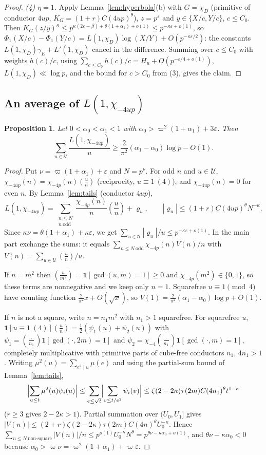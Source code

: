 \documentclass[11pt,reqno]{amsart}
\newtheorem{proposition}[theorem]{Proposition}
\theoremstyle{definition}
\newcommand{\eps}{\varepsilon}
\newcommand{\leg}[2]{\left(\frac{#1}{#2}\right)}
\newcommand{\cU}{\mathcal U}
\begin{document}
\begin{proof}
\emph{(4) $\eta=1$.}  Apply Lemma~\ref{lem:hyperbola}(b) with $G=\chi_D$
(primitive of conductor $4up$, $K_G=(1+r)C(4up)^\theta$), $z=p^\eps$ and
$y\in\{X/c,Y/c\}$, $c\le C_0$.  Then
$K_G(z/y)^\kappa\le p^{\kappa(2\eps-\beta)+\theta(1+\alpha_1)+o(1)}\le
p^{-\kappa\eps+o(1)}$, so
$\Phi_1(X/c)-\Phi_1(Y/c)=L(1,\chi_D)\log(X/Y)+O(p^{-\kappa\eps/2})$: the
constants $L(1,\chi_D)\gamma_E+L'(1,\chi_D)$ cancel in the difference.
Summing over $c\le C_0$ with weights $h(c)/c$, using
$\sum_{c\le C_0}h(c)/c=H_u+O(p^{-\eps/4+o(1)})$, $L(1,\chi_D)\ll\log p$, and
the bound for $c>C_0$ from (3), gives the claim.
\end{proof}

\subsection{An average of $L(1,\chi_{-4up})$}
\begin{proposition}\label{prop:Lavg}
Let $0<\alpha_0<\alpha_1<1$ with $\alpha_0>\varpi^2(1+\alpha_1)+3\eps$.  Then
\[
 \sum_{u\in\cU}\frac{L(1,\chi_{-4up})}{u}\ge\frac2{\pi^2}(\alpha_1-\alpha_0)\log p-O(1).
\]
\end{proposition}
\begin{proof}
Put $\nu=\varpi(1+\alpha_1)+\eps$ and $N=p^\nu$.  For odd $n$ and
$u\in\cU$, $\chi_{-4up}(n)=\chi_{-4p}(n)\leg un$ (reciprocity, $u\equiv1\
(4)$), and $\chi_{-4up}(n)=0$ for even $n$.  By Lemma~\ref{lem:tails}
(conductor $4up$),
\[
 L(1,\chi_{-4up})=\sum_{\substack{n\le N\\ n\ \mathrm{odd}}}\frac{\chi_{-4p}(n)}n\leg un+\varrho_u,
 \qquad|\varrho_u|\le(1+r)C(4up)^\theta N^{-\kappa}.
\]
Since $\kappa\nu=\theta(1+\alpha_1)+\kappa\eps$, we get
$\sum_{u\in\cU}|\varrho_u|/u\le p^{-\kappa\eps+o(1)}$.  In the main part
exchange the sums: it equals $\sum_{n\le N\ \mathrm{odd}}\chi_{-4p}(n)
V(n)/n$ with $V(n)=\sum_{u\in\cU}\leg un/u$.

If $n=m^2$ then $\leg u{m^2}=\mathbf 1[\gcd(u,m)=1]\ge0$ and
$\chi_{-4p}(m^2)\in\{0,1\}$, so these terms are nonnegative and we keep only
$n=1$.  Squarefree $u\equiv1\pmod4$ have counting function
$\frac2{\pi^2}x+O(\sqrt x)$, so
$V(1)=\frac2{\pi^2}(\alpha_1-\alpha_0)\log p+O(1)$.

If $n$ is not a square, write $n=n_1m^2$ with $n_1>1$ squarefree.  For
squarefree $u$,
$\mathbf 1[u\equiv1\ (4)]\leg un=\frac12(\psi_1(u)+\psi_2(u))$ with
$\psi_1=\leg\cdot{n_1}\mathbf 1[\gcd(\cdot,2m)=1]$ and
$\psi_2=\chi_{-4}\leg\cdot{n_1}\mathbf 1[\gcd(\cdot,m)=1]$, completely
multiplicative with primitive parts of cube-free conductors $n_1$, $4n_1>1$.
Writing $\mu^2(u)=\sum_{e^2\mid u}\mu(e)$ and using the partial-sum bound
of Lemma~\ref{lem:tails},
\[
 \Bigl|\sum_{u\le t}\mu^2(u)\psi_i(u)\Bigr|\le\sum_{e\le\sqrt
 t}\Bigl|\sum_{v\le t/e^2}\psi_i(v)\Bigr|\le\zeta(2-2\kappa)\tau(2m)C(4n_1)^\theta
 t^{1-\kappa}
\]
($r\ge3$ gives $2-2\kappa>1$).  Partial summation over $(U_0,U_1]$ gives
$|V(n)|\le(2+r)\zeta(2-2\kappa)\tau(2m)C(4n)^\theta U_0^{-\kappa}$.  Hence
$\sum_{n\le N\ \text{non-square}}|V(n)|/n\le p^{o(1)}U_0^{-\kappa}N^\theta=
p^{\theta\nu-\kappa\alpha_0+o(1)}$, and $\theta\nu-\kappa\alpha_0<0$ because
$\alpha_0>\varpi\nu=\varpi^2(1+\alpha_1)+\varpi\eps$.
\end{proof}
\end{document}
